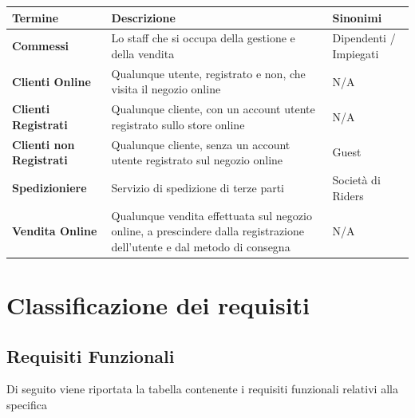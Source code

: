\documentclass[12pt, a4paper]{article}
\begin{document}
\begin{center}
\begin{tabularx}{0.95\textwidth}{|X|X|X|}
\hline
\textbf{Termine} & \textbf{Descrizione} & \textbf{Sinonimi} \\
\hline
\textbf{Commessi} & Lo staff che si occupa della gestione e della vendita & Dipendenti / Impiegati \\
\hline
\textbf{Clienti Online} & Qualunque utente, registrato e non, che visita il negozio online & N/A \\
\hline
\textbf{Clienti Registrati} & Qualunque cliente, con un account utente registrato sullo store online & N/A \\
\hline
\textbf{Clienti non Registrati} & Qualunque cliente, senza un account utente registrato sul negozio online & Guest \\
\hline
\textbf{Spedizioniere} & Servizio di spedizione di terze parti & Società di Riders \\
\hline
\textbf{Vendita Online} & Qualunque vendita effettuata sul negozio online, a prescindere dalla registrazione dell'utente e dal metodo di consegna & N/A \\
\hline
\end{tabularx}
\end{center}

\section{Classificazione dei requisiti}
\subsection{Requisiti Funzionali}
Di seguito viene riportata la tabella contenente i requisiti funzionali relativi alla specifica
\end{document}
